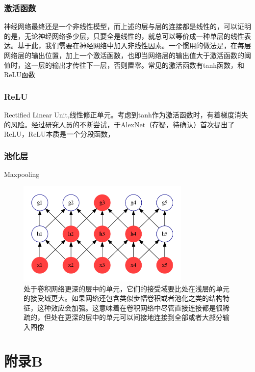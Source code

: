 \documentclass[12pt,a4paper,titlepage]{article}
\begin{document}
\subsubsection*{激活函数}
神经网络最终还是一个非线性模型，而上述的层与层的连接都是线性的，可以证明的是，无论神经网络多少层，只要全是线性的，就总可以等价成一种单层的线性表达。基于此，我们需要在神经网络中加入非线性因素。一个惯用的做法是，在每层网络层的输出位置，加上一个激活函数，也即当网络层的输出值大于激活函数的阈值时，这一层的输出才传往下一层，否则置零。常见的激活函数有tanh函数，和ReLU函数

\subsubsection*{ReLU}
Rectified Linear Unit,线性修正单元。考虑到tanh作为激活函数时，有着梯度消失的风险。经过研究人员的不断尝试，于AlexNet（存疑，待确认）首次提出了ReLU，ReLU本质是一个分段函数，

\subsubsection*{池化层}
Maxpooling



\begin{figure}[htbp]

\centering
\includegraphics[width=8.5cm]{img/deep_receptive_field.png}
\caption{处于卷积网络更深的层中的单元，它们的接受域要比处在浅层的单元的接受域更大。如果网络还包含类似步幅卷积或者池化之类的结构特征，这种效应会加强。这意味着在卷积网络中尽管直接连接都是很稀疏的，但处在更深的层中的单元可以间接地连接到全部或者大部分输入图像}
\label{fig:receptive_field}
\end{figure}

\newpage
\section*{附录B}
\end{document}
